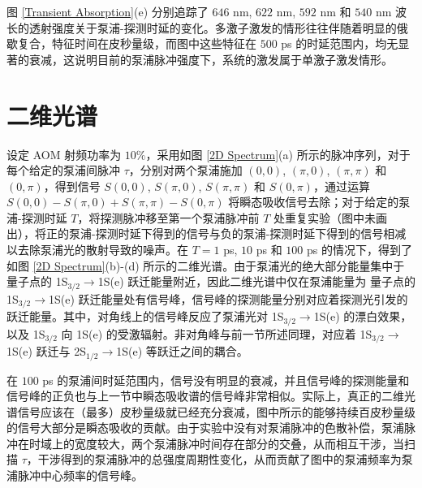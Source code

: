 \documentclass{thesis}
\begin{document}
图 \ref{Transient Absorption}(e) 分别追踪了 $646$ nm, $622$ nm, $592$ nm 和 $540$ nm 波长的透射强度关于泵浦-探测时延的变化。多激子激发的情形往往伴随着明显的俄歇复合，特征时间在皮秒量级，而图中这些特征在 $500$ ps 的时延范围内，均无显著的衰减，这说明目前的泵浦脉冲强度下，系统的激发属于单激子激发情形。

\section{二维光谱}
设定 AOM 射频功率为 $10\%$，采用如图 \ref{2D Spectrum}(a) 所示的脉冲序列，对于每个给定的泵浦间脉冲 $\tau$，分别对两个泵浦施加 $(0,0)$, $(\pi,0)$, $(\pi,\pi)$ 和 $(0,\pi)$，得到信号 $S(0,0)$, $S(\pi,0)$, $S(\pi,\pi)$ 和 $S(0,\pi)$，通过运算 $S(0,0)-S(\pi,0)+S(\pi,\pi)-S(0,\pi)$ 将瞬态吸收信号去除；对于给定的泵浦-探测时延 $T$，将探测脉冲移至第一个泵浦脉冲前 $T$ 处重复实验（图中未画出），将正的泵浦-探测时延下得到的信号与负的泵浦-探测时延下得到的信号相减以去除泵浦光的散射导致的噪声。在 $T=1$ ps, $10$ ps 和 $100$ ps 的情况下，得到了如图 \ref{2D Spectrum}(b)-(d) 所示的二维光谱。由于泵浦光的绝大部分能量集中于  量子点的 1S$_{3/2}\rightarrow$1S(e) 跃迁能量附近，因此二维光谱中仅在泵浦能量为  量子点的 1S$_{3/2}\rightarrow$1S(e) 跃迁能量处有信号峰，信号峰的探测能量分别对应着探测光引发的跃迁能量。其中，对角线上的信号峰反应了泵浦光对 1S$_{3/2}\rightarrow$1S(e) 的漂白效果，以及 1S$_{3/2}$ 向 1S(e) 的受激辐射。非对角峰与前一节所述同理，对应着 1S$_{3/2}\rightarrow$1S(e) 跃迁与 2S$_{1/2}\rightarrow$1S(e) 等跃迁之间的耦合。

在 $100$ ps 的泵浦间时延范围内，信号没有明显的衰减，并且信号峰的探测能量和信号峰的正负也与上一节中瞬态吸收谱的信号峰非常相似。实际上，真正的二维光谱信号应该在（最多）皮秒量级就已经充分衰减，图中所示的能够持续百皮秒量级的信号大部分是瞬态吸收的贡献。由于实验中没有对泵浦脉冲的色散补偿，泵浦脉冲在时域上的宽度较大，两个泵浦脉冲时间存在部分的交叠，从而相互干涉，当扫描 $\tau$，干涉得到的泵浦脉冲的总强度周期性变化，从而贡献了图中的泵浦频率为泵浦脉冲中心频率的信号峰。
\end{document}
